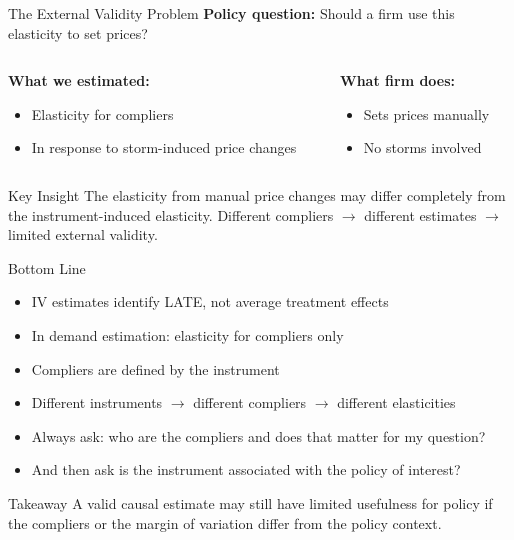 \documentclass{beamer}
\begin{document}
\begin{frame}{The External Validity Problem}
\textbf{Policy question:} Should a firm use this elasticity to set prices?
\vspace{0.3cm}

\begin{columns}
\begin{column}{0.48\textwidth}
\textbf{What we estimated:}
\begin{itemize}
    \item Elasticity for compliers
    \item In response to storm-induced price changes
\end{itemize}
\end{column}
\pause
\begin{column}{0.48\textwidth}
\textbf{What firm does:}
\begin{itemize}
    \item Sets prices manually
    \item No storms involved
\end{itemize}
\end{column}
\end{columns}
\vspace{0.5cm}
\pause
\begin{alertblock}{Key Insight}
The elasticity from manual price changes may differ completely from the instrument-induced elasticity. Different compliers $\rightarrow$ different estimates $\rightarrow$ limited external validity.
\end{alertblock}
\end{frame}

\begin{frame}{Bottom Line}
\begin{itemize}
    \item IV estimates identify LATE, not average treatment effects
    \item In demand estimation: elasticity for compliers only
    \item Compliers are defined by the instrument
    \item Different instruments $\rightarrow$ different compliers $\rightarrow$ different elasticities
    \item Always ask: who are the compliers and does that matter for my question?
    \item And then ask is the instrument associated with the policy of interest?
\end{itemize}
\vspace{0.5cm}
\pause
\begin{block}{Takeaway}
A valid causal estimate may still have limited usefulness for policy if the compliers or the margin of variation differ from the policy context.
\end{block}
\end{frame}
\end{document}
